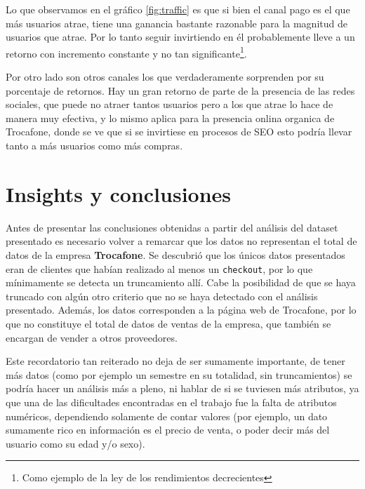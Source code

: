 \documentclass[a4paper]{article}
\begin{document}
Lo que observamos en el gráfico \ref{fig:traffic} es que si bien el canal pago es el que más usuarios atrae, tiene una ganancia bastante razonable para la magnitud de usuarios que atrae. Por lo tanto seguir invirtiendo en él probablemente lleve a un retorno con incremento constante y no tan significante\footnote{Como ejemplo de la ley de los rendimientos decrecientes}.

Por otro lado son otros canales los que verdaderamente sorprenden por su porcentaje de retornos. Hay un gran retorno de parte de la presencia de las redes sociales, que puede no atraer tantos usuarios pero a los que atrae lo hace de manera muy efectiva, y lo mismo aplica para la presencia onlina organica de Trocafone, donde se ve que si se invirtiese en procesos de SEO esto podría llevar tanto a más usuarios como más compras.

\section{Insights y conclusiones}

Antes de presentar las conclusiones obtenidas a partir del análisis del dataset presentado es necesario volver a remarcar que los datos no representan el total de datos de la empresa \textbf{Trocafone}. Se descubrió que los únicos datos presentados eran de clientes que habían realizado al menos un \texttt{checkout}, por lo que mínimamente se detecta un truncamiento allí. Cabe la posibilidad de que se haya truncado con algún otro criterio que no se haya detectado con el análisis presentado. Además, los datos corresponden a la página web de Trocafone, por lo que no constituye el total de datos de ventas de la empresa, que también se encargan de vender a otros proveedores.

Este recordatorio tan reiterado no deja de ser sumamente importante, de tener más datos (como por ejemplo un semestre en su totalidad, sin truncamientos) se podría hacer un análisis más a pleno, ni hablar de si se tuviesen más atributos, ya que una de las dificultades encontradas en el trabajo fue la falta de atributos numéricos, dependiendo solamente de contar valores (por ejemplo, un dato sumamente rico en información es el precio de venta, o poder decir más del usuario como su edad y/o sexo).
\end{document}
